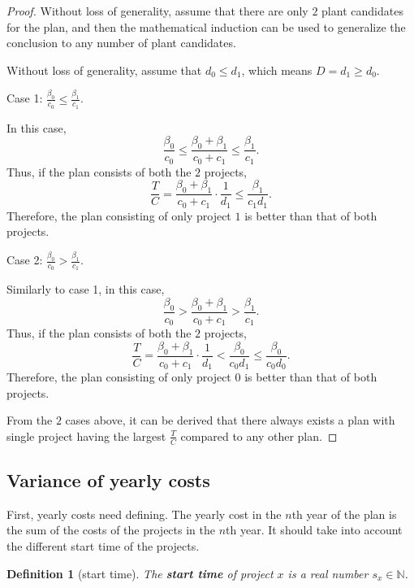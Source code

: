 \documentclass{article}
\newtheorem{definition}{Definition}
\begin{document}
\begin{proof}
Without loss of generality, assume that there are only $2$ plant candidates for the plan,
and then the mathematical induction can be used to generalize the conclusion to any number of plant candidates.

Without loss of generality, assume that $d_0\le d_1$, which means $D=d_1\ge d_0$.

Case 1: $\frac{\beta_0}{c_0}\le\frac{\beta_1}{c_1}$.

In this case,
\begin{equation*}
\frac{\beta_0}{c_0}\le\frac{\beta_0+\beta_1}{c_0+c_1}\le\frac{\beta_1}{c_1}.
\end{equation*}
Thus, if the plan consists of both the $2$ projects,
\begin{equation*}
\frac TC=\frac{\beta_0+\beta_1}{c_0+c_1}\cdot\frac1{d_1}\le\frac{\beta_1}{c_1d_1}.
\end{equation*}
Therefore, the plan consisting of only project $1$ is better than that of both projects.

Case 2: $\frac{\beta_0}{c_0}>\frac{\beta_1}{c_1}$.

Similarly to case 1, in this case,
\begin{equation*}
\frac{\beta_0}{c_0}>\frac{\beta_0+\beta_1}{c_0+c_1}>\frac{\beta_1}{c_1}.
\end{equation*}
Thus, if the plan consists of both the $2$ projects,
\begin{equation*}
\frac TC=\frac{\beta_0+\beta_1}{c_0+c_1}\cdot\frac1{d_1}<\frac{\beta_0}{c_0d_1}\le\frac{\beta_0}{c_0d_0}.
\end{equation*}
Therefore, the plan consisting of only project $0$ is better than that of both projects.

From the $2$ cases above, it can be derived that there always exists a plan with single project having the largest $\frac TC$ compared to any other plan.
\end{proof}

\subsection{Variance of yearly costs}
\label{sec:variance of yearly costs}

First, yearly costs need defining.
The yearly cost in the $n$th year of the plan is the sum of the costs of the projects in the $n$th year.
It should take into account the different start time of the projects.

\begin{definition}[start time]
The \textbf{start time} of project $x$ is a real number $s_x\in\mathbb N$.
\end{definition}
\end{document}
